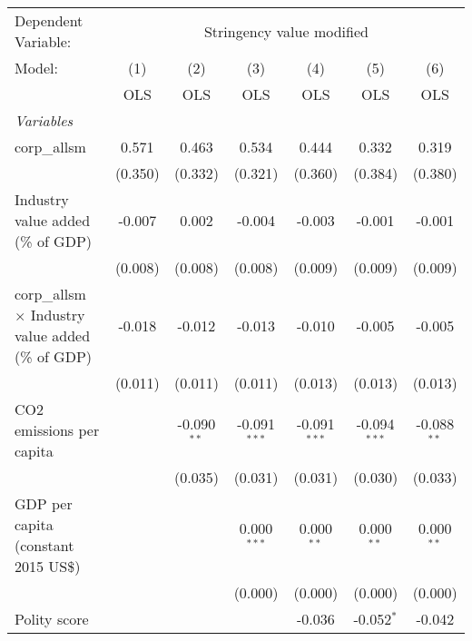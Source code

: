 
\begingroup
\centering
\begin{tabular}{lcccccc}
   \toprule
   Dependent Variable: & \multicolumn{6}{c}{Stringency value modified}\\
   Model:                                                   & (1)     & (2)           & (3)            & (4)            & (5)            & (6)\\  
                                                            &  OLS    & OLS           & OLS            & OLS            & OLS            & OLS\\  
   \midrule
   \emph{Variables}\\
   corp\_allsm                                              & 0.571   & 0.463         & 0.534          & 0.444          & 0.332          & 0.319\\   
                                                            & (0.350) & (0.332)       & (0.321)        & (0.360)        & (0.384)        & (0.380)\\   
   Industry value added (\% of GDP)                         & -0.007  & 0.002         & -0.004         & -0.003         & -0.001         & -0.001\\   
                                                            & (0.008) & (0.008)       & (0.008)        & (0.009)        & (0.009)        & (0.009)\\   
   corp\_allsm $\times$ Industry value added (\% of GDP)    & -0.018  & -0.012        & -0.013         & -0.010         & -0.005         & -0.005\\   
                                                            & (0.011) & (0.011)       & (0.011)        & (0.013)        & (0.013)        & (0.013)\\   
   CO2 emissions per capita                                 &         & -0.090$^{**}$ & -0.091$^{***}$ & -0.091$^{***}$ & -0.094$^{***}$ & -0.088$^{**}$\\   
                                                            &         & (0.035)       & (0.031)        & (0.031)        & (0.030)        & (0.033)\\   
   GDP per capita (constant 2015 US\$)                      &         &               & 0.000$^{***}$  & 0.000$^{**}$   & 0.000$^{**}$   & 0.000$^{**}$\\   
                                                            &         &               & (0.000)        & (0.000)        & (0.000)        & (0.000)\\   
   Polity score                                             &         &               &                & -0.036         & -0.052$^{*}$   & -0.042\\   

\end{tabular}

